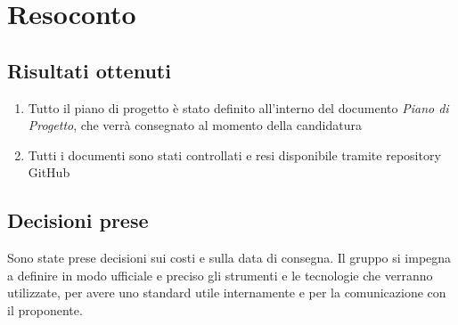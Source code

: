 \section{Resoconto}

\subsection{Risultati ottenuti}
\begin{enumerate}
    \item Tutto il piano di progetto è stato definito all'interno del documento \textit{Piano di Progetto}, che verrà consegnato al momento della candidatura
    \item Tutti i documenti sono stati controllati e resi disponibile tramite repository GitHub
\end{enumerate}

\subsection{Decisioni prese}
Sono state prese decisioni sui costi e sulla data di consegna. Il gruppo si impegna a definire in modo ufficiale e preciso gli strumenti e le tecnologie che verranno utilizzate, per avere uno standard utile internamente e per la comunicazione con il proponente.